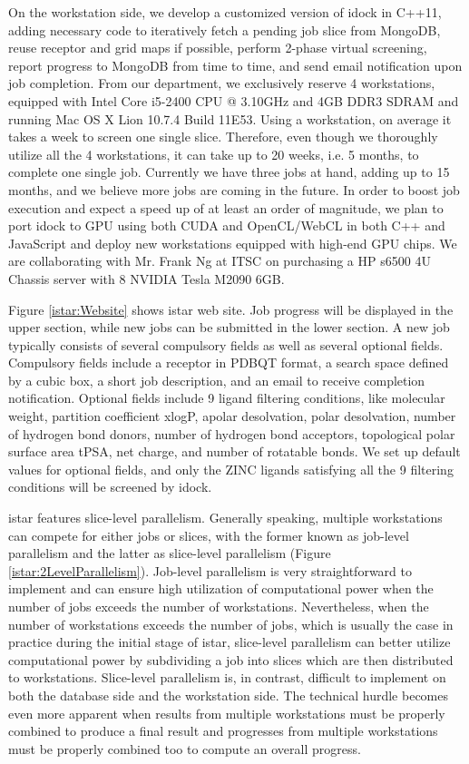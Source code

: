 On the workstation side, we develop a customized version of idock in C++11, adding necessary code to iteratively fetch a pending job slice from MongoDB, reuse receptor and grid maps if possible, perform 2-phase virtual screening, report progress to MongoDB from time to time, and send email notification upon job completion. From our department, we exclusively reserve 4 workstations, equipped with Intel Core i5-2400 CPU @ 3.10GHz and 4GB DDR3 SDRAM and running Mac OS X Lion 10.7.4 Build 11E53. Using a workstation, on average it takes a week to screen one single slice. Therefore, even though we thoroughly utilize all the 4 workstations, it can take up to 20 weeks, i.e. 5 months, to complete one single job. Currently we have three jobs at hand, adding up to 15 months, and we believe more jobs are coming in the future. In order to boost job execution and expect a speed up of at least an order of magnitude, we plan to port idock to GPU using both CUDA and OpenCL/WebCL in both C++ and JavaScript and deploy new workstations equipped with high-end GPU chips. We are collaborating with Mr. Frank Ng at ITSC on purchasing a HP s6500 4U Chassis server with 8 NVIDIA Tesla M2090 6GB.

Figure \ref{istar:Website} shows istar web site. Job progress will be displayed in the upper section, while new jobs can be submitted in the lower section. A new job typically consists of several compulsory fields as well as several optional fields. Compulsory fields include a receptor in PDBQT format, a search space defined by a cubic box, a short job description, and an email to receive completion notification. Optional fields include 9 ligand filtering conditions, like molecular weight, partition coefficient xlogP, apolar desolvation, polar desolvation, number of hydrogen bond donors, number of hydrogen bond acceptors, topological polar surface area tPSA, net charge, and number of rotatable bonds. We set up default values for optional fields, and only the ZINC ligands satisfying all the 9 filtering conditions will be screened by idock.

istar features slice-level parallelism. Generally speaking, multiple workstations can compete for either jobs or slices, with the former known as job-level parallelism and the latter as slice-level parallelism (Figure \ref{istar:2LevelParallelism}). Job-level parallelism is very straightforward to implement and can ensure high utilization of computational power when the number of jobs exceeds the number of workstations. Nevertheless, when the number of workstations exceeds the number of jobs, which is usually the case in practice during the initial stage of istar, slice-level parallelism can better utilize computational power by subdividing a job into slices which are then distributed to workstations. Slice-level parallelism is, in contrast, difficult to implement on both the database side and the workstation side. The technical hurdle becomes even more apparent when results from multiple workstations must be properly combined to produce a final result and progresses from multiple workstations must be properly combined too to compute an overall progress.

